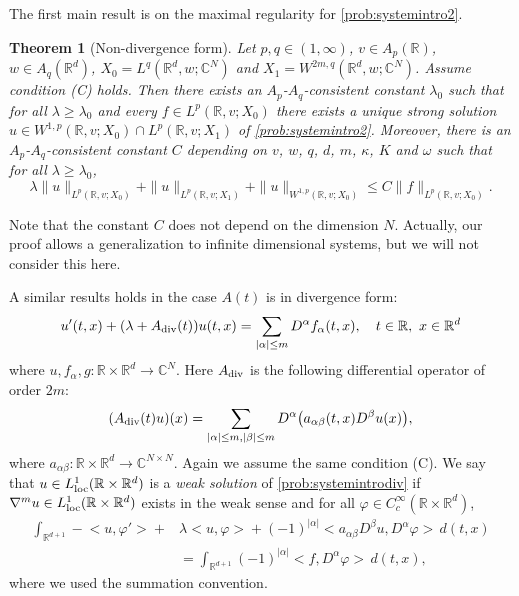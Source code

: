 \documentclass{amsart}
\theoremstyle{plain}
\newtheorem{theorem}{Theorem}[section]
\theoremstyle{remark}
\theoremstyle{plain}
\numberwithin{equation}{section}
\begin{document}
The first main result is on the maximal regularity for \eqref{prob:systemintro2}.
\begin{theorem}[Non-divergence form]\label{teo:mainxdep}
Let $p,q\in (1,\infty)$, $v\in A_{p}({ \mathbb{R} })$, $w\in A_{q}({ \mathbb{R} }^{d})$, $X_0 = L^q({ \mathbb{R} }^d,w;{ \mathbb{C} }^N)$ and $X_1 = W^{2m,q}({ \mathbb{R} }^d,w;{ \mathbb{C} }^N)$. Assume condition (C) holds.
Then there exists an $A_p$-$A_q$-consistent constant $\lambda_0$ such that for all $\lambda\geq\lambda_0$ and every $f\in L^{p}({ \mathbb{R} },v;X_{0})$ there exists a unique strong solution $u\in W^{1,p}({ \mathbb{R} },v;X_0)\cap L^p({ \mathbb{R} },v;X_1)$ of \eqref{prob:systemintro2}. Moreover, there is an $A_p$-$A_q$-consistent constant $C$ depending on $v$, $w$, $q$, $d$, $m$, $\kappa$, $K$ and $\omega$ such that for all $\lambda\geq \lambda_0$,
\begin{equation}\label{eq:teomainxdep}
\lambda\|u\|_{L^{p}({ \mathbb{R} },v;X_{0})}+\|u\|_{L^p({ \mathbb{R} },v;X_1)}+\|u\|_{W^{1,p}({ \mathbb{R} },v;X_0)}\leq C\|f\|_{L^{p}({ \mathbb{R} },v;X_{0})}.
\end{equation}
\end{theorem}
Note that the constant $C$ does not depend on the dimension $N$. Actually, our proof allows a generalization to infinite dimensional systems, but we will not consider this here.

\medskip

A similar results holds in the case $A(t)$ is in divergence form:
\begin{equation}\label{prob:systemintrodiv}
u'(t,x)+(\lambda+A_{\rm div}(t))u(t,x)=\sum_{|\alpha|\leq m} D^{\alpha} f_{\alpha}(t,x),\ \ \ t\in{ \mathbb{R} },\ x\in{ \mathbb{R} }^{d}
\end{equation}
where $u,f_{\alpha},g:{ \mathbb{R} }\times { \mathbb{R} }^d\to { \mathbb{C} }^N$. Here $A_{\rm div}$ is the following differential operator of order $2m$:
\begin{equation}\label{eq:defoperatordiv}
(A_{\rm div}(t) u)(x) = \sum_{|\alpha|\leq m,|\beta|\leq m} D^{\alpha}\big(a_{\alpha\beta}(t,x)D^\beta u(x)\big),
\end{equation}
where $a_{\alpha\beta}:{ \mathbb{R} }\times { \mathbb{R} }^{d}\rightarrow { \mathbb{C} }^{N\times N}$. Again we assume the same condition (C).
We say that $u\in L^1_{\rm loc}({ \mathbb{R} }\times { \mathbb{R} }^d)$ is a {\em weak solution} of \eqref{prob:systemintrodiv} if $\nabla^m u\in L^1_{\rm loc}({ \mathbb{R} }\times { \mathbb{R} }^d)$ exists in the weak sense and for all $\varphi\in C^\infty_c({ \mathbb{R} }\times{ \mathbb{R} }^d)$,
\begin{align*}
\int_{{ \mathbb{R} }^{d+1}}  -\big<u, \varphi'\big> + & \lambda \big< u,\varphi\big>   +  (-1)^{|\alpha|} \big< a_{\alpha\beta} D^{\beta} u, D^{\alpha}\varphi\big> \, d(t,x)
\\ & = \int_{{ \mathbb{R} }^{d+1}} (-1)^{|\alpha|}  \big< f, D^{\alpha} \varphi\big> \, d(t,x),
\end{align*}
where we used the summation convention.
\end{document}
